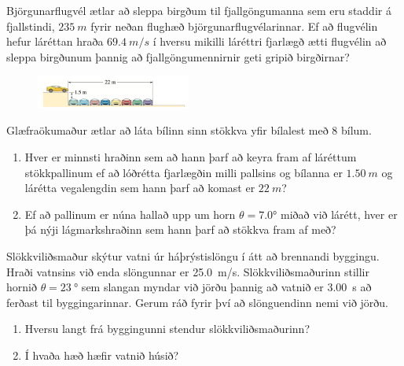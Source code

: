 \ifdefined \wholebook \else\documentclass[oneside]{book}\usepackage{EdlBook}\graphicspath{{figures/}}
\begin{document}
\begin{enumerate}[label = \textbf{Dæmi \thechapter.\arabic*.}]
\begin{minipage}{\linewidth}
\item Björgunarflugvél ætlar að sleppa birgðum til fjallgöngumanna sem eru staddir á fjallstindi, $\SI{235}{m}$ fyrir neðan flughæð björgunarflugvélarinnar. Ef að flugvélin hefur láréttan hraða $\SI{69.4}{m/s}$ í hversu mikilli láréttri fjarlægð ætti flugvélin að sleppa birgðunum þannig að fjallgöngumennirnir geti gripið birgðirnar?

\end{minipage}

\vspace{1cm}

\begin{minipage}{\linewidth}
\vspace{-1cm}
\begin{figure}
\includegraphics[width=2in]{images/bilalest.png}
\end{figure}

\item Glæfraökumaður ætlar að láta bílinn sinn stökkva yfir bílalest með $8$ bílum.
\begin{enumerate}[label = \textbf{(\alph*)}]
    \item Hver er minnsti hraðinn sem að hann þarf að keyra fram af láréttum stökkpallinum ef að lóðrétta fjarlægðin milli pallsins og bílanna er $\SI{1.50}{m}$ og lárétta vegalengdin sem hann þarf að komast er $\SI{22}{m}$?
    \item Ef að pallinum er núna hallað upp um horn $\theta = \ang{7.0}$ miðað við lárétt, hver er þá nýji lágmarkshraðinn sem hann þarf að stökkva fram af með?
\end{enumerate}

\end{minipage}

\item Slökkviliðsmaður skýtur vatni úr háþrýstislöngu í átt að brennandi byggingu. Hraði vatnsins við enda slöngunnar er \SI{25,0}{m/s}. Slökkviliðsmaðurinn stillir hornið $\theta = \SI{23}{\degree}$ sem slangan myndar við jörðu þannig að vatnið er \SI{3.00}{s} að ferðast til byggingarinnar. Gerum ráð fyrir því að slönguendinn nemi við jörðu.
\begin{enumerate}[label = \textbf{(\alph*)}]
    \item Hversu langt frá byggingunni stendur slökkviliðsmaðurinn?
\item Í hvaða hæð hæfir vatnið húsið?
\end{enumerate}


\end{enumerate}
\end{document}
